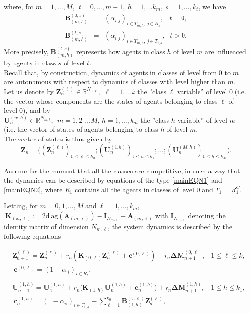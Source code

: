 \documentclass[article,12pt]{article}
\theoremstyle{plain}
\theoremstyle{definition}
\theoremstyle{remark}
\numberwithin{equation}{section}
\numberwithin{theorem}{section}
\newcommand{\R}{\mathbb R}
\begin{document}
		where, for  $m=1,\ldots, M,\ \  t=0,\ldots , m-1,\   h=1,\ldots k_m,\ s=1,\ldots, k_t$, we have
		\begin{eqnarray*}
			\mathbf{B}_{(m , h)}^{(0, s)} &=& (\alpha_{i,j})_{i\in T_{m, h}, \  j\in R_s},\ \ \ \ t=0,\\ 
			\mathbf{B}_{(m , h)}^{(t, s)} &=& (\alpha_{i,j})_{i\in T_{m, h},\  j\in T_{t, s}},\ \ \  t>0. 
		\end{eqnarray*}
		More precisely, $\mathbf{B}_{(m , h)}^{(t, s)}$ represents how agents in class $h$ of level $m$ are influenced by agents in class $s$ of level $t$.\\
		Recall that, by construction, dynamics of agents in classes of level from 0 to $m$ are autonomous with respect to dynamics of classes with level higher than $m$. \\
		Let us denote by 
		$\mathbf{Z}^{(\ell)}_n\in \R^{N_{0, \ell}},\ \ \ell=1,\ldots k$ the ''class $\ell$ variable'' of level 0 (i.e. the vector whose components are the states of agents belonging to class $\ell$ of level 0), and by \\
		$\mathbf{U}^{(m, h)}_n\in \R^{N_{m,h}},\ \ m=1,2,\ldots M,\ h=1,\ldots, k_m$ the ''class $h$ variable'' of level $m$ (i.e. the vector of states of agents belonging to class $h$ of level $m$.\\
		The vector of states is thus given by $$\mathbf{\bar{Z}}_n=\big( (\mathbf{Z}^{(\ell)}_n)_{1\leq\ell\leq k_0}; (\mathbf{U}^{(1, h)}_n)_{1\leq h\leq k_1}; \ldots ;(\mathbf{U}^{(M, h)}_n)_{1\leq h\leq k_M}\big).$$
		
		Assume for the moment that all the classes are competitive, in such a way that the dynamics can be described by equations of the type \eqref{mainEQN1} and \eqref{mainEQN2}, where $R_1$ contains all the agents in classes of level 0 and  $T_1=R_1^C$. 
		
		Letting, for $m=0,1,\ldots, M$ and $\ell=1,\ldots, k_m$, 
		$\ \mathbf{K}_{(m, \ell)}:=2 \mathrm{diag}(\mathbf{A}_{(m,\ell)})-{\mathrm{\mathbf{I}}}_{N_{m,\ell}}-\mathbf{A}_{(m,\ell)}$  with  $\mathrm{\mathbf{I}}_{N_{m, \ell}}$ denoting the identity matrix of dimension $N_{m,\ell}$, the system dynamics is described by the following equations
		
		\begin{align}
			&\mathbf{Z}_{n+1}^{(\ell)}=\mathbf{Z}^{(\ell)}_n+ r_n (\mathbf{K}_{(0,\ell)}\mathbf{Z}_n^{(\ell)}+\mathbf{c}^{(0, \ell)})+ r_n \mathbf{\Delta M}^{(0,\ell)}_{n+1}, &1\leq \ell\leq k, \label{EQNz}\\
			&\ \mathbf{c}^{(0,\ell)}=(1-\alpha_{ii})_{i\in R_\ell},\nonumber\\
			& \nonumber\\
			&\mathbf{U}^{(1,h)}_{n+1}=\mathbf{U}^{(1,h)}_n +r_n\big( \mathbf{K}_{(1,h)}\mathbf{U}^{(1,h)}_n+\mathbf{c}^{(1,h)}_n\big)+ r_n\mathbf{\Delta M}^{(1,h)}_{n+1},&    1\leq h\leq k_1,\label{EQNm1}\\
			&\ \mathbf{c}^{(1, h)}_n=(1-\alpha_{ii})_{i\in T_{1, h}}- \sum_{\ell=1}^{k_0} \mathbf{B}_{(1, h)}^{(0, \ell)}\mathbf{Z}^{(\ell)}_n,\nonumber
		\end{align}
		
\end{document}
